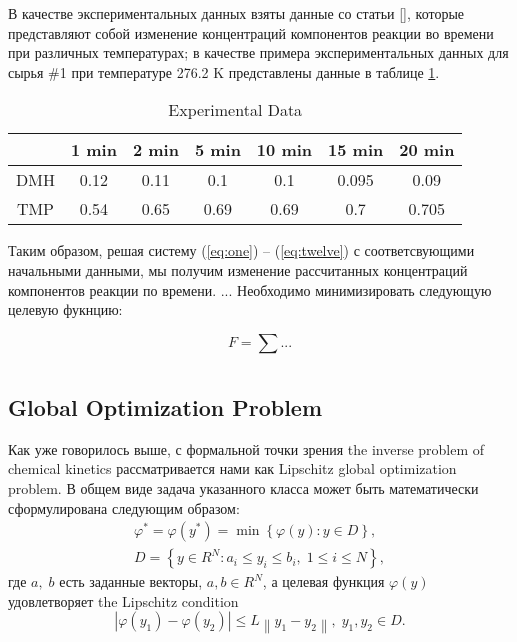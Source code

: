 \documentclass{svproc}
\begin{document}
В качестве экспериментальных данных взяты данные со статьи [], которые представляют собой изменение концентраций компонентов реакции во времени при различных температурах; в качестве примера экспериментальных данных для сырья \#1 при температуре 276.2 K представлены данные в таблице \ref{table1}.

\begin{table}
\label{table1}
\caption{Experimental Data}
\begin{center}
\begin{tabular}{ccccccc}
\hline
& 1 min & 2 min & 5 min & 10 min & 15 min & 20 min  \\
\hline\rule{0pt}{12pt}
DMH & 0.12 & 0.11 & 0.1	& 0.1 &	0.095 &	0.09  \\
TMP & 0.54 & 0.65 & 0.69 & 0.69 & 0.7 & 0.705 \\[2pt]
\hline
\end{tabular}
\end{center}
\end{table}

Таким образом, решая систему (\ref{eq:one}) -- (\ref{eq:twelve}) с соответсвующими начальными данными, мы получим изменение рассчитанных концентраций компонентов реакции по времени. ...
Необходимо минимизировать следующую целевую фукнцию:

\begin{equation}
  F = \sum ...
  \label{eq:objective_func}
\end{equation}


\section{}\label{Sec_GSA}

\subsection{Global Optimization Problem}

Как уже говорилось выше, с формальной точки зрения the inverse problem of chemical kinetics рассматривается нами как Lipschitz global optimization problem. 
В общем виде задача указанного класса может быть математически сформулирована следующим образом:
\begin{gather}
 \varphi^* = \varphi(y^\ast)=\min{\left\{\varphi(y):y\in D\right\}}, \label{problemN}\\
 D=\left\{y\in R^N: a_i\leq y_i \leq b_i, \;  1\leq i \leq N\right\} \label{D},
\end{gather}
где $a,\; b$ есть заданные векторы, $a,b\in R^N$, а целевая функция $\varphi(y)$ удовлетворяет the Lipschitz condition
\begin{equation}\label{Lip}
\left|\varphi(y_1)-\varphi(y_2)\right|\leq L\left\|y_1-y_2\right\|,\; y_1,y_2 \in D.
\end{equation}
\end{document}
